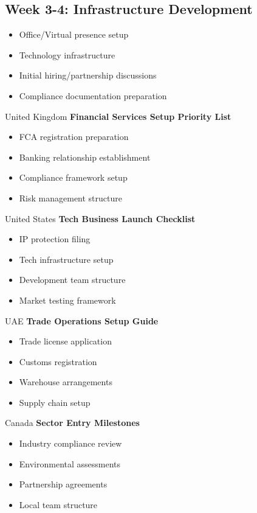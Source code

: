 \subsection{Week 3-4: Infrastructure Development}
\begin{itemize}
    \item Office/Virtual presence setup
    \item Technology infrastructure
    \item Initial hiring/partnership discussions
    \item Compliance documentation preparation
\end{itemize}

\begin{regionalbox}{United Kingdom}
\textbf{Financial Services Setup Priority List}
\begin{itemize}
    \item FCA registration preparation
    \item Banking relationship establishment
    \item Compliance framework setup
    \item Risk management structure
\end{itemize}
\end{regionalbox}

\begin{regionalbox}{United States}
\textbf{Tech Business Launch Checklist}
\begin{itemize}
    \item IP protection filing
    \item Tech infrastructure setup
    \item Development team structure
    \item Market testing framework
\end{itemize}
\end{regionalbox}

\begin{regionalbox}{UAE}
\textbf{Trade Operations Setup Guide}
\begin{itemize}
    \item Trade license application
    \item Customs registration
    \item Warehouse arrangements
    \item Supply chain setup
\end{itemize}
\end{regionalbox}

\begin{regionalbox}{Canada}
\textbf{Sector Entry Milestones}
\begin{itemize}
    \item Industry compliance review
    \item Environmental assessments
    \item Partnership agreements
    \item Local team structure
\end{itemize}
\end{regionalbox}

